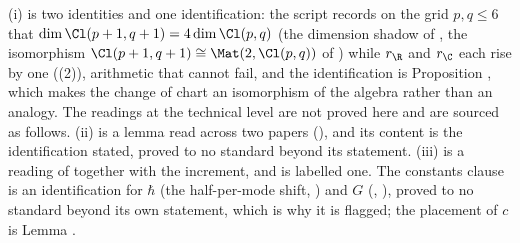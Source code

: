 (i) is two identities and one identification: the script records on the grid $p, q \leq 6$ that $\dim \Cl(p+1,q+1) = 4\dim\Cl(p,q)$ (the dimension shadow of , the isomorphism $\Cl(p+1,q+1) \cong \Mat(2, \Cl(p,q))$ of ) while $r_{\R}$ and $r_{\C}$ each rise by one ((2)), arithmetic that cannot fail, and the identification is Proposition , which makes the change of chart an isomorphism of the algebra rather than an analogy. The readings at the technical level are not proved here and are sourced as follows. (ii) is a lemma read across two papers (), and its content is the identification stated, proved to no standard beyond its statement. (iii) is a reading of  together with the increment, and is labelled one. The constants clause is an identification for $\hbar$ (the half-per-mode shift, ) and $G$ (, ), proved to no standard beyond its own statement, which is why it is flagged; the placement of $c$ is Lemma .
